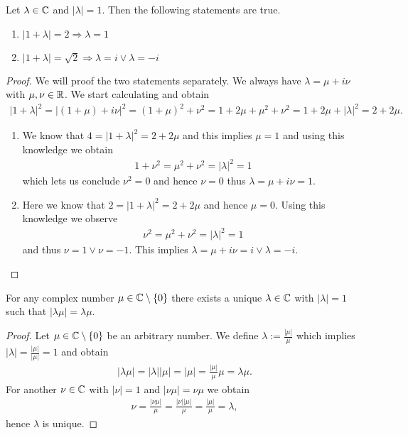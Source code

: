 \begin{lemma} \label{lemma:complex_geom}
	Let $\lambda \in \mathbb{C}$ and $|\lambda| = 1$. Then the following statements are true.
	\begin{enumerate}
		\item $|1 + \lambda| = 2 \Rightarrow \lambda = 1$
		\item $|1 + \lambda| = \sqrt{2} \Rightarrow \lambda = i \lor \lambda = -i$
	\end{enumerate}
\end{lemma}

\begin{proof}
	We will proof the two statements separately. We always have $\lambda = \mu + i \nu$ with $\mu, \nu \in \mathbb{R}$. We start calculating and obtain
	\begin{align*}
		|1 + \lambda|^2 = |(1 + \mu) + i \nu|^2 = (1 + \mu)^2 + \nu^2 = 1 + 2\mu + \mu^2 + \nu^2 = 1 + 2\mu + |\lambda|^2 = 2 + 2 \mu.
	\end{align*}
	\begin{enumerate}
		\item We know that $4 = |1 + \lambda|^2 = 2 + 2\mu$ and this implies $\mu = 1$ and using this knowledge we obtain
		\begin{align*}
			1 + \nu^2 = \mu^2 + \nu^2 = |\lambda|^2 = 1
		\end{align*}
		which lets us conclude $\nu^2 = 0$ and hence $\nu = 0$ thus $\lambda = \mu + i \nu = 1$. 
		
		\item Here we know that $2 = |1 + \lambda|^2 = 2 + 2\mu$ and hence $\mu = 0$. Using this knowledge we observe
		\begin{align*}
			\nu^2 = \mu^2 + \nu^2 = |\lambda|^2 = 1
		\end{align*}
		and thus $\nu = 1 \lor \nu = -1$. This implies $\lambda = \mu + i \nu = i \lor \lambda = -i$.  
	\end{enumerate}
\end{proof}

\begin{lemma} \label{lemma:phase_adjustment_complex}
	For any complex number $\mu \in \mathbb{C} \setminus \{0\}$ there exists a unique $\lambda \in \mathbb{C}$ with $|\lambda| = 1$ such that $|\lambda \mu| = \lambda \mu$. 
\end{lemma}

\begin{proof}
	Let $\mu \in \mathbb{C} \setminus \{0\}$ be an arbitrary number. We define $\lambda := \frac{|\mu|}{\mu}$ which implies $|\lambda| = \frac{|\mu|}{|\mu|} = 1$ and obtain
	\begin{align*}
		|\lambda \mu| = |\lambda| |\mu| = |\mu| = \frac{|\mu|}{\mu} \mu = \lambda \mu.
	\end{align*}
	For another $\nu \in \mathbb{C}$ with $|\nu| = 1$ and $|\nu \mu| = \nu \mu$ we obtain
	\begin{align*}
		\nu = \frac{|\nu \mu|}{\mu} = \frac{|\nu| |\mu|}{\mu} = \frac{|\mu|}{\mu} = \lambda,
	\end{align*}
	hence $\lambda$ is unique. 
\end{proof}

